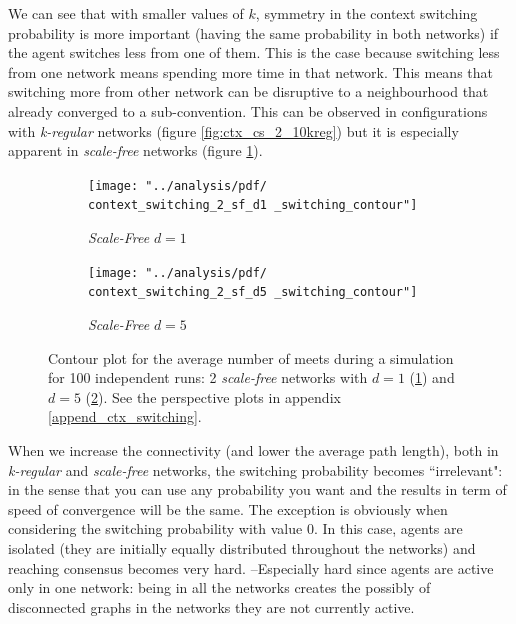 \documentclass[preprint,number]{elsarticle}
\begin{document}
\noindent We can see that with smaller values of $k$, symmetry in the context switching probability is more important (having the same probability in both networks) if the agent switches less from one of them. This is the case because switching less from one network means spending more time in that network. This means that switching more from other network can be disruptive to a neighbourhood that already converged to a sub-convention. This can be observed in configurations with \textit{k-regular} networks (figure \ref{fig:ctx_cs_2_10kreg}) but it is especially apparent in \textit{scale-free} networks (figure \ref{fig:ctx_cs_2_sf_d1}).

\begin{figure}[H]
	\centering
	\begin{subfigure}{0.49\linewidth}
		\centering
		\texttt{[image: "../analysis/pdf/  context\_switching\_2\_sf\_d1 \_switching\_contour"]}
		\caption{\textit{Scale-Free} $d=1$}
		\label{fig:ctx_cs_2_sf_d1}
	\end{subfigure}%
	\begin{subfigure}{0.49\linewidth}
		\centering
		\texttt{[image: "../analysis/pdf/  context\_switching\_2\_sf\_d5 \_switching\_contour"]}
		\caption{\textit{Scale-Free} $d=5$}
		\label{fig:ctx_cs_2_sf_d5}
	\end{subfigure}
	
	\begin{minipage}{0.9\linewidth}
		\vspace{0.2cm}
		\caption{Contour plot for the average number of meets during a simulation for 100 independent runs: 2 \textit{scale-free} networks with $d=1$ (\ref{fig:ctx_cs_2_sf_d1}) and $d=5$ (\ref{fig:ctx_cs_2_sf_d5}). See the perspective plots in  appendix \ref{append_ctx_switching}.}
		\label{fig:ctx_cs_2_sf}
	\end{minipage}
\end{figure}

When we increase the connectivity (and lower the average path length), both in \textit{k-regular} and \textit{scale-free} networks, the switching probability becomes ``irrelevant": in the sense that you can use any probability you want and the results in term of speed of convergence will be the same. The exception is obviously when considering the switching probability with value $0$. In this case, agents are isolated (they are initially equally distributed throughout the networks) and reaching consensus becomes very hard. --Especially hard since agents are active only in one network: being in all the networks creates the possibly of disconnected graphs in the networks they are not currently active.
\end{document}
